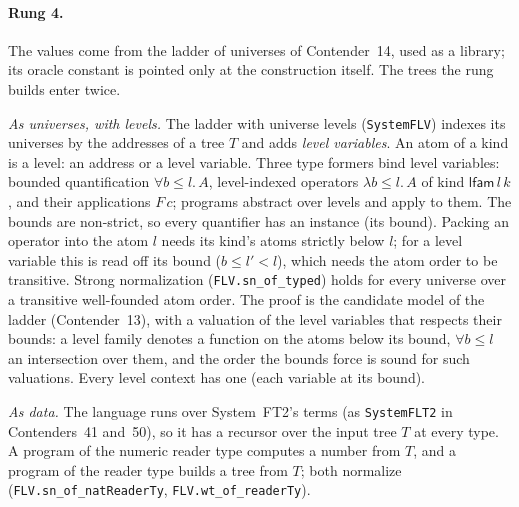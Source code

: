 \documentclass[11pt]{article}
\theoremstyle{definition}
\theoremstyle{remark}
\newcommand{\lean}[1]{\texttt{#1}}
\begin{document}
\paragraph{Rung 4.} The values come from the ladder of universes of
Contender~14, used as a library; its oracle constant is pointed only at the
construction itself. The trees the rung builds enter twice.

\emph{As universes, with levels.} The ladder with universe levels
(\lean{SystemFLV}) indexes its universes by the addresses of a tree $T$ and
adds \emph{level variables}. An atom of a kind is a level: an address or a
level variable. Three type formers bind level variables: bounded
quantification $\forall b\le l.\,A$, level-indexed operators
$\lambda b\le l.\,A$ of kind $\mathsf{lfam}\,l\,k$, and their applications
$F\,c$; programs abstract over levels and apply to them. The bounds are
non-strict, so every quantifier has an instance (its bound). Packing an
operator into the atom $l$ needs its kind's atoms strictly below $l$; for a
level variable this is read off its bound ($b\le l'<l$), which needs the atom
order to be transitive. Strong normalization (\lean{FLV.sn\_of\_typed}) holds
for every universe over a transitive well-founded atom order. The proof is the
candidate model of the ladder (Contender~13), with a valuation of the level
variables that respects their bounds: a level family denotes a function on the
atoms below its bound, $\forall b\le l$ an intersection over them, and the
order the bounds force is sound for such valuations. Every level context has
one (each variable at its bound).

\emph{As data.} The language runs over System~FT2's terms (as
\lean{SystemFLT2} in Contenders~41 and~50), so it has a recursor over the
input tree $T$ at every type. A program of the numeric reader type computes a
number from $T$, and a program of the reader type builds a tree from $T$; both
normalize (\lean{FLV.sn\_of\_natReaderTy}, \lean{FLV.wt\_of\_readerTy}).
\end{document}
